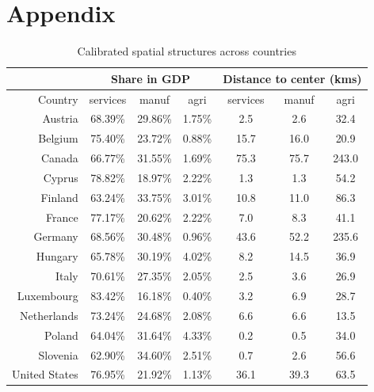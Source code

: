 \documentclass[12pt]{article}
\begin{document}




\clearpage

\section{Appendix}

\begin{table}[htbp]
  \centering
  \caption{Calibrated spatial structures across countries}
    \begin{tabular}{rcccccc}
    \toprule
          & \multicolumn{3}{c}{Share in GDP} & \multicolumn{3}{c}{Distance to center (kms)} \\
    \midrule
    Country & services & manuf & agri  & services & manuf & agri \\
    Austria & 68.39\% & 29.86\% & 1.75\% & 2.5   & 2.6   & 32.4 \\
    Belgium & 75.40\% & 23.72\% & 0.88\% & 15.7  & 16.0  & 20.9 \\
    Canada & 66.77\% & 31.55\% & 1.69\% & 75.3  & 75.7  & 243.0 \\
    Cyprus & 78.82\% & 18.97\% & 2.22\% & 1.3   & 1.3   & 54.2 \\
    Finland & 63.24\% & 33.75\% & 3.01\% & 10.8  & 11.0  & 86.3 \\
    France & 77.17\% & 20.62\% & 2.22\% & 7.0   & 8.3   & 41.1 \\
    Germany & 68.56\% & 30.48\% & 0.96\% & 43.6  & 52.2  & 235.6 \\
    Hungary & 65.78\% & 30.19\% & 4.02\% & 8.2   & 14.5  & 36.9 \\
    Italy & 70.61\% & 27.35\% & 2.05\% & 2.5   & 3.6   & 26.9 \\
    Luxembourg & 83.42\% & 16.18\% & 0.40\% & 3.2   & 6.9   & 28.7 \\
    Netherlands & 73.24\% & 24.68\% & 2.08\% & 6.6   & 6.6   & 13.5 \\
    Poland & 64.04\% & 31.64\% & 4.33\% & 0.2   & 0.5   & 34.0 \\
    Slovenia & 62.90\% & 34.60\% & 2.51\% & 0.7   & 2.6   & 56.6 \\
    United States & 76.95\% & 21.92\% & 1.13\% & 36.1  & 39.3  & 63.5 \\
    \bottomrule
    \end{tabular}%
  \label{tab:share_dist}%
\end{table}%
\end{document}
